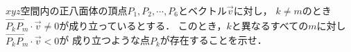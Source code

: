 \documentclass[../../main.tex]{subfiles}
\begin{document}
$xyz$空間内の正八面体の頂点$P_1,P_2,\cdots,P_6$とベクトル$\vec{v}$に対し，
$k \neq m$のとき$\overrightarrow{P_kP_m}\cdot\vec{v}\neq0$が成り立っているとする．
このとき，$k$と異なるすべての$m$に対し$\overrightarrow{P_kP_m}\cdot\vec{v}<0$が
成り立つような点$P_k$が存在することを示せ．
\end{document}
